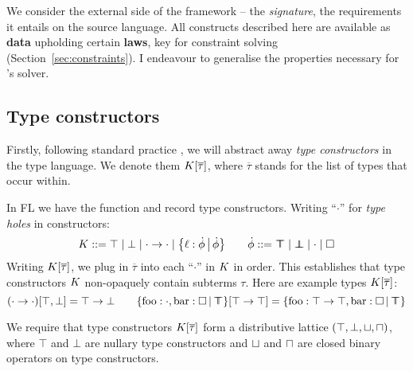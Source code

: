 We consider the external side of the \inference{} framework -- the \emph{signature}, \ie{} the requirements it entails on the source language. 
All constructs described here are available as \textbf{data} upholding certain \textbf{laws}, key for constraint solving  (Section~\ref{sec:constraints}). I endeavour to generalise the properties necessary for \mlstruct{}'s solver.

\subsection{Type constructors}

Firstly, following standard practice \cite{essence-of-ml-type-inference, constraint-based-freeze-ml}, we will abstract away \emph{type constructors} in the type language. We denote them $K[\overline \tau]$, where $\overline \tau$ stands for the list of types that occur within.
\begin{example}
    In FL we have the function and record type constructors. Writing \enquote{$\cdot$} for \emph{type holes} in constructors:
    $$
       \constr ::= \top \mid \bot \mid {\cdot} \to {\cdot} \mid \flext{\ell : \dot \phi}{\dot \phi} \qquad \dot \phi ::= \flftop \mid \flfbot \mid \cdot \mid \flabsent
    $$
    Writing $K[\overline \tau]$, we plug in $\overline \tau$ into each \enquote{$\cdot$} in $K$ in order. This establishes that type constructors $K$ non-opaquely contain subterms $\tau$. Here are example types $K[\overline \tau]$:
    $$
        (\cdot \to \cdot)[\top, \bot] = \top \to \bot \qquad \flext{\mathrm{foo}: \cdot, \mathrm{bar} : \flabsent}{\flftop}[\top \to \top] = \flext{\mathrm{foo}: \top \to \top, \mathrm{bar} : \flabsent}{\flftop}
    $$
\end{example}

We require that type constructors $K[\overline \tau]$ form a distributive lattice $(\top, \bot, \sqcup, \sqcap)$, where $\top$ and $\bot$ are nullary type constructors and $\sqcup$ and $\sqcap$ are closed binary operators on type constructors. 

